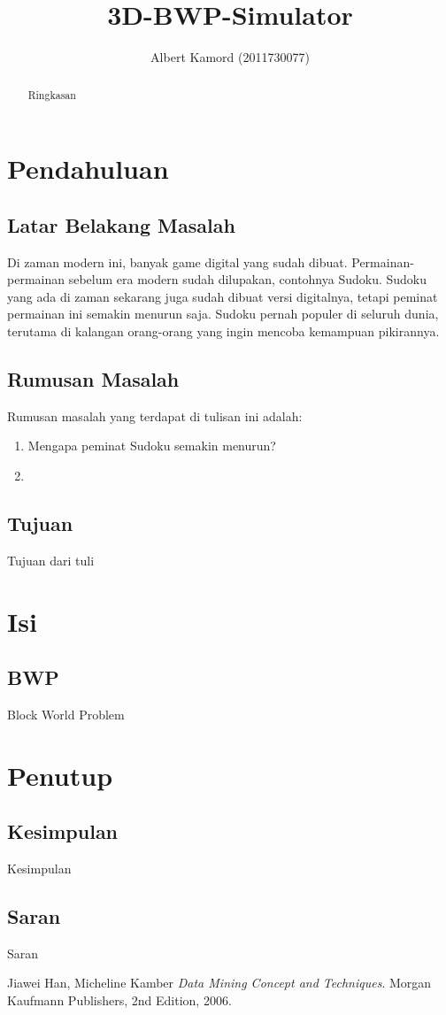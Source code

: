 \documentclass[11pt,a4paper]{report}
\author{Albert Kamord (2011730077)}
\title{3D-BWP-Simulator}
\begin{document}
\maketitle
\begin{abstract}

\indent Ringkasan \\
\end{abstract}

\tableofcontents \newpage 	%
\listoffigures \newpage 	%


\chapter{Pendahuluan} %
\section{Latar Belakang Masalah}
\indent Di zaman modern ini, banyak game digital yang sudah dibuat. Permainan-permainan sebelum era modern sudah dilupakan, contohnya Sudoku. Sudoku yang ada di zaman sekarang juga sudah dibuat versi digitalnya, tetapi peminat permainan ini semakin menurun saja. Sudoku pernah populer di seluruh dunia, terutama di kalangan orang-orang yang ingin mencoba kemampuan pikirannya.

\section{Rumusan Masalah}
Rumusan masalah yang terdapat di tulisan ini adalah:
\begin{enumerate}
	\item Mengapa peminat Sudoku semakin menurun?
	\item 
\end{enumerate}

\section{Tujuan}
Tujuan dari tuli

\chapter{Isi} %
\section{BWP}
Block World Problem


\chapter{Penutup} %
\section{Kesimpulan}
Kesimpulan
\section{Saran}
Saran

\begin{thebibliography}{9}

  Jiawei Han, Micheline Kamber
  \emph{Data Mining Concept and Techniques}.
  Morgan Kaufmann Publishers,
  2nd Edition,
  2006.

\end{thebibliography}
\end{document}
